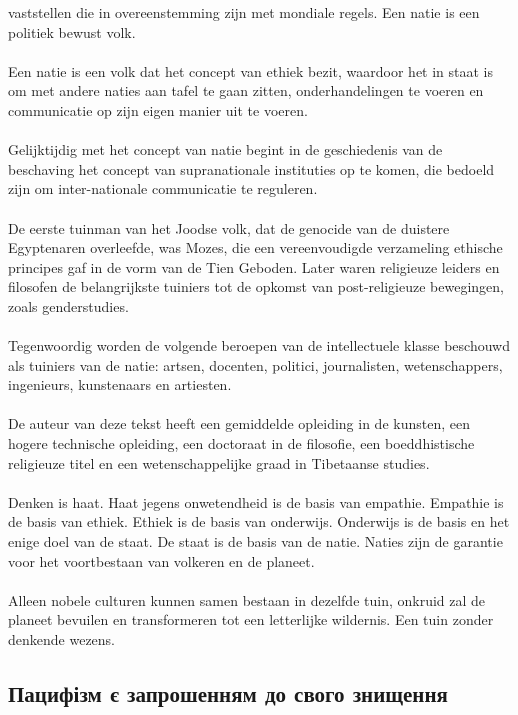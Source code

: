 vaststellen die in overeenstemming zijn met mondiale regels.
Een natie is een politiek bewust volk.
\\
\\
Een natie is een volk dat het concept van ethiek bezit,
waardoor het in staat is om met andere naties aan tafel
te gaan zitten, onderhandelingen te voeren en communicatie
op zijn eigen manier uit te voeren.
\\
\\
Gelijktijdig met het concept van natie begint in de geschiedenis
van de beschaving het concept van supranationale instituties op
te komen, die bedoeld zijn om inter-nationale communicatie te reguleren.
\\
\\
De eerste tuinman van het Joodse volk, dat de genocide van
de duistere Egyptenaren overleefde, was Mozes, die een
vereenvoudigde verzameling ethische principes gaf in de
vorm van de Tien Geboden. Later waren religieuze leiders
en filosofen de belangrijkste tuiniers tot de opkomst van
post-religieuze bewegingen, zoals genderstudies.
\\
\\
Tegenwoordig worden de volgende beroepen van de intellectuele
klasse beschouwd als tuiniers van de natie: artsen, docenten,
politici, journalisten, wetenschappers, ingenieurs, kunstenaars en artiesten.
\\
\\
De auteur van deze tekst heeft een gemiddelde opleiding in de kunsten,
een hogere technische opleiding, een doctoraat in de filosofie,
een boeddhistische religieuze titel en een wetenschappelijke
graad in Tibetaanse studies.
\\
\\
Denken is haat. Haat jegens onwetendheid is de basis van empathie.
Empathie is de basis van ethiek. Ethiek is de basis van onderwijs.
Onderwijs is de basis en het enige doel van de staat. De staat is
de basis van de natie. Naties zijn de garantie voor het voortbestaan
van volkeren en de planeet.
\\
\\
Alleen nobele culturen kunnen samen bestaan in dezelfde tuin,
onkruid zal de planeet bevuilen en transformeren tot een
letterlijke wildernis. Een tuin zonder denkende wezens.

\newpage
\subsection{Пацифізм є запрошенням до свого знищення}

